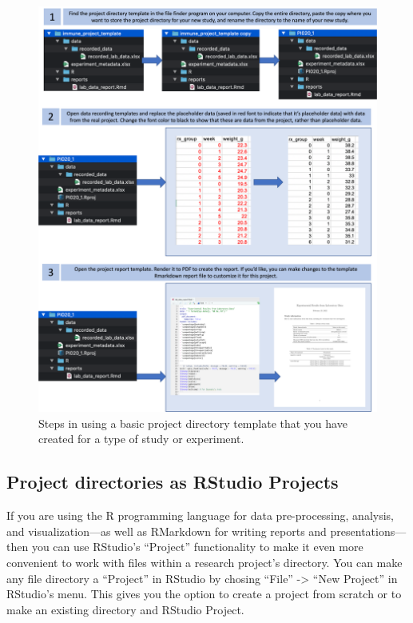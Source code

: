 \documentclass[]{tufte-book}
\begin{document}
\begin{figure}
\includegraphics[width=\textwidth]{figures/project_template_basic_use} \caption[Steps in using a basic project directory template that you have created for a type of study or experiment]{Steps in using a basic project directory template that you have created for a type of study or experiment.}\label{fig:basicprojecttemplateuse}
\end{figure}

\subsection{Project directories as RStudio Projects}\label{project-directories-as-rstudio-projects}

If you are using the R programming language for data pre-processing, analysis,
and visualization---as well as RMarkdown for writing reports and
presentations---then you can use RStudio's ``Project'' functionality to make it
even more convenient to work with files within a research project's directory.
You can make any file directory a ``Project'' in RStudio by chosing ``File'' -\textgreater{}
``New Project'' in RStudio's menu. This gives you the option to create a
project from scratch or to make an existing directory and RStudio Project.
\end{document}
